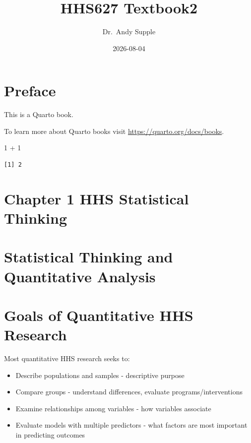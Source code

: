 \documentclass[
  letterpaper,
  DIV=11,
  numbers=noendperiod]{scrreprt}
\title{HHS627 Textbook2}
\author{Dr.~Andy Supple}
\date{2026-08-04}
\newenvironment{Shaded}{\begin{snugshade}}{\end{snugshade}}
\newcommand{\DecValTok}[1]{\textcolor[rgb]{0.68,0.00,0.00}{#1}}
\newcommand{\SpecialCharTok}[1]{\textcolor[rgb]{0.37,0.37,0.37}{#1}}
\providecommand{\tightlist}{%
  \setlength{\itemsep}{0pt}\setlength{\parskip}{0pt}}
\renewcommand*\contentsname{Table of contents}
\newcommand\contentsname{Table of contents}
\begin{document}
\maketitle

\renewcommand*\contentsname{Table of contents}
{
\setcounter{tocdepth}{2}
\tableofcontents
}


\chapter*{Preface}\label{preface}


This is a Quarto book.

To learn more about Quarto books visit
\url{https://quarto.org/docs/books}.

\begin{Shaded}
\begin{Highlighting}[]
\DecValTok{1} \SpecialCharTok{+} \DecValTok{1}
\end{Highlighting}
\end{Shaded}

\begin{verbatim}
[1] 2
\end{verbatim}


\chapter{Chapter 1 HHS Statistical
Thinking}\label{chapter-1-hhs-statistical-thinking}


\chapter{Statistical Thinking and Quantitative
Analysis}\label{statistical-thinking-and-quantitative-analysis}


\chapter{Goals of Quantitative HHS
Research}\label{goals-of-quantitative-hhs-research}

Most quantitative HHS research seeks to:

\begin{itemize}
\tightlist
\item
  Describe populations and samples - descriptive purpose
\item
  Compare groups - understand differences, evaluate
  programs/interventions
\item
  Examine relationships among variables - how variables associate
\item
  Evaluate models with multiple predictors - what factors are most
  important in predicting outcomes
\end{itemize}
\end{document}
